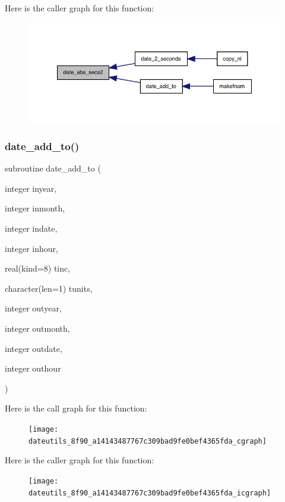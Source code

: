 Here is the caller graph for this function\+:
\nopagebreak
\begin{figure}[H]
\begin{center}
\leavevmode
\includegraphics[width=347pt]{dateutils_8f90_a56423cc8c95e08c48faaadf0ae9a2100_icgraph}
\end{center}
\end{figure}
\mbox{\label{dateutils_8f90_a14143487767c309bad9fe0bef4365fda}} 
\subsubsection{\texorpdfstring{date\+\_\+add\+\_\+to()}{date\_add\_to()}}
{\footnotesize\ttfamily subroutine date\+\_\+add\+\_\+to (\begin{DoxyParamCaption}\item[{integer}]{inyear,  }\item[{integer}]{inmonth,  }\item[{integer}]{indate,  }\item[{integer}]{inhour,  }\item[{real(kind=8)}]{tinc,  }\item[{character(len=1)}]{tunits,  }\item[{integer}]{outyear,  }\item[{integer}]{outmonth,  }\item[{integer}]{outdate,  }\item[{integer}]{outhour }\end{DoxyParamCaption})}

Here is the call graph for this function\+:
\nopagebreak
\begin{figure}[H]
\begin{center}
\leavevmode
\texttt{[image: dateutils\_8f90\_a14143487767c309bad9fe0bef4365fda\_cgraph]}
\end{center}
\end{figure}
Here is the caller graph for this function\+:
\nopagebreak
\begin{figure}[H]
\begin{center}
\leavevmode
\texttt{[image: dateutils\_8f90\_a14143487767c309bad9fe0bef4365fda\_icgraph]}
\end{center}
\end{figure}
\mbox{\label{dateutils_8f90_abd0aaee09a0949cfef32003dae34f41d}} 
